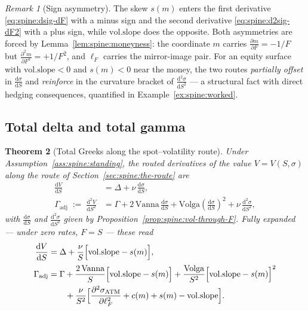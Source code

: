 \documentclass[11pt]{book}
\theoremstyle{plain}
\newtheorem{theorem}{Theorem}[chapter]
\theoremstyle{definition}
\theoremstyle{remark}
\newtheorem{remark}[theorem]{Remark}
\newcommand{\mln}{m}                             %
\newcommand{\lF}{\ell_F}                         %
\newcommand{\satm}{\sigma_{\mathrm{ATM}}}        %
\newcommand{\volslope}{\mathrm{vol.slope}}       %
\newcommand{\vega}{\nu}                          %
\newcommand{\Vanna}{\mathrm{Vanna}}
\newcommand{\Volga}{\mathrm{Volga}}
\newcommand{\Gadj}{\Gamma_{\mathrm{adj}}}        %
\newcommand{\dd}{\mathrm{d}}                                  %
\newcommand{\pd}[2]{\frac{\partial #1}{\partial #2}}          %
\newcommand{\pdd}[2]{\frac{\partial^2 #1}{\partial #2^2}}     %
\newcommand{\td}[2]{\frac{\dd #1}{\dd #2}}                    %
\begin{document}
\begin{remark}[Sign asymmetry]\label{rem:spine:sign-asymmetry}
The skew $s(\mln)$ enters the first derivative
\eqref{eq:spine:dsig-dF} with a minus sign and the second derivative
\eqref{eq:spine:d2sig-dF2} with a plus sign, while $\volslope$ does the
opposite. Both asymmetries are forced by
Lemma~\ref{lem:spine:moneyness}: the coordinate $\mln$ carries
$\pd{\mln}{F} = -1/F$ but $\pdd{\mln}{F} = +1/F^2$, and $\lF$ carries the
mirror-image pair. For an equity surface with $\volslope < 0$ and
$s(\mln) < 0$ near the money, the two routes \emph{partially offset} in
$\td{\sigma}{S}$ and \emph{reinforce} in the curvature bracket of
$\frac{\dd^2\sigma}{\dd S^2}$ --- a structural fact with direct hedging
consequences, quantified in Example~\ref{ex:spine:worked}.
\end{remark}

\subsection{Total delta and total gamma}\label{sec:spine:total-greeks}

\begin{theorem}[Total Greeks along the spot--volatility route]\label{thm:spine:total-greeks}
Under Assumption~\ref{ass:spine:standing}, the routed derivatives of the value
$V = V(S, \sigma)$ along the route of Section~\ref{sec:spine:the-route} are
\begin{align}
  \td{V}{S} &= \Delta + \vega\,\td{\sigma}{S},
    \label{eq:spine:total-delta}\\[2pt]
  \Gadj \;:=\; \frac{\dd^2 V}{\dd S^2}
  &= \Gamma
   + 2\,\Vanna\,\td{\sigma}{S}
   + \Volga\left(\td{\sigma}{S}\right)^{\!2}
   + \vega\,\frac{\dd^2 \sigma}{\dd S^2},
    \label{eq:spine:total-gamma}
\end{align}
with $\td{\sigma}{S}$ and $\frac{\dd^2\sigma}{\dd S^2}$ given by
Proposition~\ref{prop:spine:vol-through-F}. Fully expanded --- under zero
rates, $F = S$ --- these read
\begin{align}
  \td{V}{S}
  &= \Delta + \frac{\vega}{S}\Bigl[\volslope - s(\mln)\Bigr],
    \label{eq:spine:total-delta-expanded}\\[2pt]
  \Gadj
  &= \Gamma
   + \frac{2\,\Vanna}{S}\Bigl[\volslope - s(\mln)\Bigr]
   + \frac{\Volga}{S^2}\Bigl[\volslope - s(\mln)\Bigr]^2 \notag\\
  &\qquad
   + \frac{\vega}{S^2}\Bigl[\pdd{\satm}{\lF} + c(\mln) + s(\mln) - \volslope\Bigr].
    \label{eq:spine:total-gamma-expanded}
\end{align}
\end{theorem}
\end{document}
